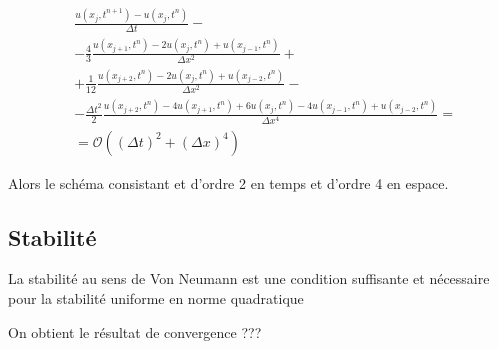 \documentclass[a4paper,11pt]{article}
\begin{document}
\begin{align*}
    & \frac{u(x_{j}, t^{n+1}) - u(x_{j}, t^{n})}{\Delta t} - \\
    & -\frac{4}{3} \frac{u(x_{j+1}, t^{n}) - 2u(x_{j}, t^{n}) + u(x_{j-1}, t^{n})}{\Delta x^{2}} + \\
    & +\frac{1}{12} \frac{u(x_{j+2}, t^{n}) - 2u(x_{j}, t^{n}) + u(x_{j-2}, t^{n})}{\Delta x^{2}} - \\
    & -\frac{\Delta t^{2}}{2} \frac{u(x_{j+2}, t^{n}) - 4u(x_{j+1}, t^{n}) + 6u(x_{j}, t^{n})  - 4u(x_{j-1}, t^{n}) + u(x_{j-2}, t^{n})}{\Delta x^{4}} = \\
   & = \mathcal{O}((\Delta t)^{2} + (\Delta x)^{4})
\end{align*}

Alors le schéma consistant et d'ordre 2 en temps et d'ordre 4 en espace.

\subsection{Stabilité}
La stabilité au sens de Von Neumann est une condition suffisante et nécessaire pour la stabilité uniforme en norme quadratique

On obtient le résultat de convergence ???

\subsection{}
\end{document}
